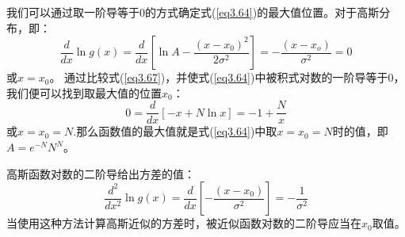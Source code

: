 \documentclass[UTF8]{ctexart}
\numberwithin{equation}{section}%
\numberwithin{figure}{section}%
\begin{document}
    我们可以通过取一阶导等于0的方式确定式(\ref{eq3.64})的最大值位置。对于高斯分布，即：
    \begin{equation}\label{eq3.67}
        \frac{d}{d x} \ln g(x)=\frac{d}{d x}\left[\ln A-\frac{\left(x-x_{0}\right)^{2}}{2 \sigma^{2}}\right]=-\frac{\left(x-x_{o}\right)}{\sigma^{2}}=0
    \end{equation}
    或$x=x_0$。
    通过比较式(\ref{eq3.67})，并使式(\ref{eq3.64})中被积式对数的一阶导等于0，我们便可以找到取最大值的位置$x_0$：
    \begin{equation}
        0=\frac{d}{d x}[-x+N\ln x]=-1+\frac{N}{x}
    \end{equation}
    或$x=x_0=N$.那么函数值的最大值就是式(\ref{eq3.64})中取$x=x_0=N$时的值，即$A=e^{-N}N^N$。

    高斯函数对数的二阶导给出方差的值：
    \begin{equation}
        \frac{d^{2}}{d x^{2}} \ln g(x)=\frac{d}{d x}\left[-\frac{\left(x-x_{0}\right)}{\sigma^{2}}\right]=-\frac{1}{\sigma^{2}}
    \end{equation}
    当使用这种方法计算高斯近似的方差时，被近似函数对数的二阶导应当在$x_0$取值。
\end{document}
